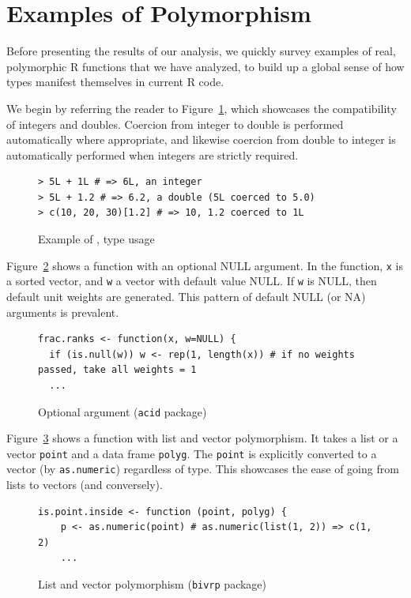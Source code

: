 \documentclass[acmsmall,10pt,review,anonymous]{acmart}\settopmatter{printfolios=true,printccs=false,printacmref=false}
\newcommand{\code}[1]{\lstinline|#1|\xspace}
\begin{document}
%
%
%
\section{Examples of Polymorphism}\label{sec:polyex}

Before presenting the results of our analysis, we  quickly survey
examples of real, polymorphic R functions that we have analyzed, to build up
a global sense of how types manifest themselves in current R code.

We begin by referring the reader to Figure~\ref{fig:realex}, which showcases
the compatibility of integers and doubles.  Coercion from integer to double
is performed automatically where appropriate, and likewise coercion from
double to integer is automatically performed when integers are strictly
required.

\begin{figure}[!hb]{\small\begin{lstlisting}[style=R]
> 5L + 1L # => 6L, an integer
> 5L + 1.2 # => 6.2, a double (5L coerced to 5.0)
> c(10, 20, 30)[1.2] # => 10, 1.2 coerced to 1L
\end{lstlisting}}\caption{Example of \sD, \sI type usage}\label{fig:realex}\end{figure}

Figure~\ref{fig:optnull} shows a function with an optional NULL argument.
In the function, {\tt x} is a sorted vector, and {\tt w} a vector with
default value NULL.  If {\tt w} is NULL, then default unit weights are
generated.  This pattern of default NULL (or NA) arguments is prevalent.

\begin{figure}[!hb]{\small\begin{lstlisting}[style=R]
frac.ranks <- function(x, w=NULL) {
  if (is.null(w)) w <- rep(1, length(x)) # if no weights passed, take all weights = 1
  ...
\end{lstlisting}}\caption{Optional argument ({\tt acid} package)}\label{fig:optnull}\end{figure}

Figure~\ref{fig:listvec} shows a function with list and vector polymorphism.
It takes a list or a vector {\tt point} and a data frame {\tt polyg}.  The
{\tt point} is explicitly converted to a vector (by \code{as.numeric})
regardless of type.  This showcases the ease of going from lists to vectors
(and conversely).

\begin{figure}[!hb]{\small\begin{lstlisting}[style=R]
is.point.inside <- function (point, polyg) {
    p <- as.numeric(point) # as.numeric(list(1, 2)) => c(1, 2)
    ...
\end{lstlisting}}\caption{List and vector polymorphism ({\tt bivrp} package)}\label{fig:listvec}\end{figure}
\end{document}
